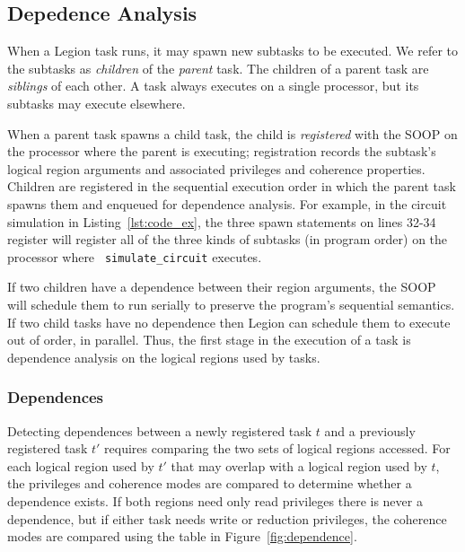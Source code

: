 \subsection{Depedence Analysis}
\label{sec:dep}


When a Legion task runs, it may spawn new subtasks to be executed.  We refer to the
subtasks as {\em children} of the {\em parent} task.  The children of a parent task
are {\em siblings} of each other.  A task always executes on a single processor, but
its subtasks may execute elsewhere.

When a parent task spawns a child task, the child is {\em registered}
with the SOOP on the processor where the parent is executing;
registration records the subtask's logical region arguments and
associated privileges and coherence properties.  Children are
registered in the sequential execution order in which the parent task
spawns them and enqueued for dependence analysis.  For example, in the
circuit simulation in Listing~\ref{lst:code_ex}, the three spawn
statements on lines 32-34 register will register all of the three
kinds of subtasks (in program order) on the processor where {\tt
simulate\_circuit} executes.

If two children have a dependence between their region arguments, the
SOOP will schedule them to run serially to preserve the program's
sequential semantics.  If two child tasks have no dependence then
Legion can schedule them to execute out of order, in parallel.  Thus,
the first stage in the execution of a task is dependence analysis on
the logical regions used by tasks.

\subsubsection{Dependences}
Detecting dependences between a newly registered task $t$ and a previously registered task 
$t'$ requires comparing the two sets of logical regions accessed.  For each logical region used by
$t'$ that may overlap with a logical region used by $t$, the privileges
and coherence modes are compared to determine whether a dependence exists.  If
both regions need only read privileges there is never a dependence, but if either
task needs write or reduction privileges, the coherence modes are compared using
the table in Figure~\ref{fig:dependence}.

